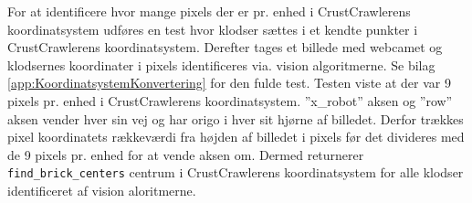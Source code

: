 For at identificere hvor mange pixels der er pr. enhed i CrustCrawlerens koordinatsystem udføres en test hvor klodser sættes i et kendte punkter i CrustCrawlerens koordinatsystem.
Derefter tages et billede med webcamet og klodsernes koordinater i pixels identificeres via. vision algoritmerne.
Se bilag \vref{app:KoordinatsystemKonvertering} for den fulde test.
Testen viste at der var 9 pixels pr. enhed i CrustCrawlerens koordinatsystem.
''x\_robot'' aksen og ''row'' aksen vender hver sin vej og har origo i hver sit hjørne af billedet.
Derfor trækkes pixel koordinatets rækkeværdi fra højden af billedet i pixels før det divideres med de 9 pixels pr. enhed for at vende aksen om.
Dermed returnerer \texttt{find\_brick\_centers} centrum i CrustCrawlerens koordinatsystem for alle klodser identificeret af vision aloritmerne.












